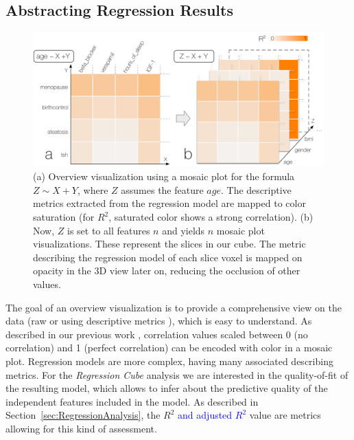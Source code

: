 \documentclass[journal]{style/vgtc} 			          %
\newcommand{\add}[1]{\textcolor{blue}{#1}}
\begin{document}
\subsection{Abstracting Regression Results}
\begin{figure}[htb]
 \centering
 \includegraphics[width=1.0\linewidth]{figures/cube}
 \caption{
 (a) Overview visualization using a mosaic plot for the formula $Z \sim X + Y$, where $Z$ assumes the feature $age$.
 The descriptive metrics extracted from the regression model are mapped to color saturation (for $R^2$, saturated color shows a strong correlation).
 (b) Now, $Z$ is set to all features $n$ and yields $n$ mosaic plot visualizations.
 These represent the slices in our cube.
 The metric describing the regression model of each slice voxel is mapped on opacity in the 3D view later on, reducing the occlusion of other values.
 }
  \label{fig:Cube}
\end{figure}
\noindent The goal of an overview visualization is to provide a comprehensive view on the data (raw or using descriptive metrics \cite{Bertini}), which is easy to understand.
As described in our previous work \cite{Klemm2014VIS}, correlation values scaled between 0 (no correlation) and 1 (perfect correlation) can be encoded with color in a mosaic plot.
Regression models are more complex, having many associated describing metrics.
For the \emph{Regression Cube} analysis we are interested in the quality-of-fit of the resulting model, which allows to infer about the predictive quality of the independent features included in the model.
As described in Section~\ref{sec:RegressionAnalysis}, the $R^2$ \add{and adjusted $R^2$} value are metrics allowing for this kind of assessment.
\end{document}
